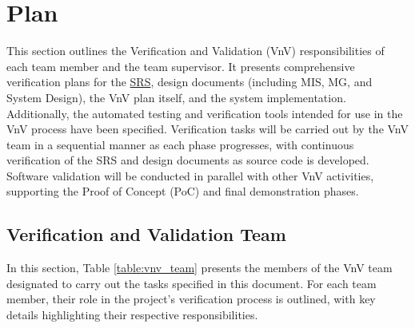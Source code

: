 \documentclass[12pt, titlepage]{article}
\begin{document}
\section{Plan}
This section outlines the Verification and Validation (VnV) responsibilities of
each team member and the team supervisor. It presents comprehensive verification
plans for the
\href{https://github.com/SumanyaG/Alkalytics/blob/f856af96669275cc29428a8f2cd4b863e4523ff6/docs/SRS/SRS.pdf}{SRS},
design documents (including MIS, MG, and System Design), the VnV plan itself,
and the system implementation.\\
\newline Additionally, the automated testing and verification tools intended for
use in the VnV process have been specified. Verification tasks will be carried
out by the VnV team in a sequential manner as each phase progresses, with
continuous verification of the SRS and design documents as source code is
developed. Software validation will be conducted in parallel with other VnV
activities, supporting the Proof of Concept (PoC) and final demonstration
phases.

\subsection{Verification and Validation Team}\label{section:vnv_team} In this
section, Table \ref{table:vnv_team} presents the members of the VnV team
designated to carry out the tasks specified in this document. For each team
member, their role in the project's verification process is outlined, with key
details highlighting their respective responsibilities.
\end{document}

